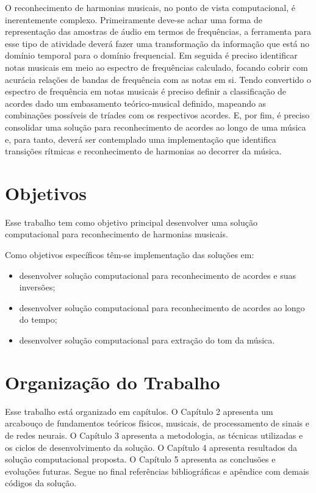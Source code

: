 O reconhecimento de harmonias musicais, no ponto de vista computacional, é inerentemente complexo. Primeiramente deve-se achar uma forma de representação das amostras de áudio em termos de frequências, a ferramenta para esse tipo de atividade deverá fazer uma transformação da informação que está no domínio temporal para o domínio frequencial. Em seguida é preciso identificar notas musicais em meio ao espectro de frequências calculado, focando cobrir com acurácia relações de bandas de frequência com as notas em si. Tendo convertido o espectro de frequência em notas musicais é preciso definir a classificação de acordes dado um embasamento teórico-musical definido, mapeando as combinações possíveis de tríades com os respectivos acordes. E, por fim, é preciso consolidar uma solução para reconhecimento de acordes ao longo de uma música e, para tanto, deverá ser contemplado uma implementação que identifica transições rítmicas e reconhecimento de harmonias ao decorrer da música.

\section{Objetivos}
\label{sec:objetivos}

Esse trabalho tem como objetivo principal desenvolver uma solução computacional para reconhecimento de harmonias musicais.

Como objetivos específicos têm-se implementação das soluções em:
\begin{itemize}
\item desenvolver solução computacional para reconhecimento de acordes e suas inversões;
\item desenvolver solução computacional para reconhecimento de acordes ao longo do tempo;
\item desenvolver solução computacional para extração do tom da música.
\end{itemize}


\section{Organização do Trabalho}
\label{sec:organizacao}

Esse trabalho está organizado em capítulos. O Capítulo 2 apresenta um arcabouço de fundamentos teóricos físicos, musicais, de processamento de sinais e de redes neurais. O Capítulo 3 apresenta a metodologia, as técnicas utilizadas e os ciclos de desenvolvimento da solução. O Capítulo 4 apresenta resultados da solução computacional proposta. O Capítulo 5 apresenta as conclusões e evoluções futuras. Segue no final referências bibliográficas e apêndice com demais códigos da solução.
